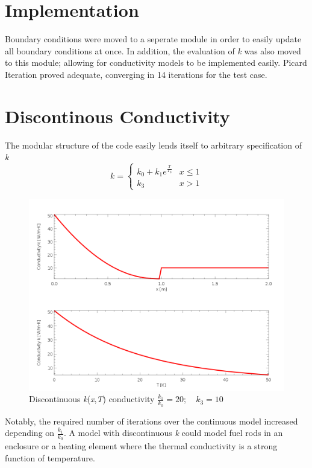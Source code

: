 \documentclass[12pt,twocolumn]{article}
\begin{document}
\section*{Implementation}
Boundary conditions were moved to a seperate module in order to easily update all boundary conditions at once. In addition, the evaluation of \emph{k}
was also moved to this module; allowing for conductivity models to be implemented easily. Picard Iteration proved adequate, converging
in 14 iterations for the test case.
\section*{Discontinous Conductivity}
The modular structure of the code easily lends itself to arbitrary specification of \emph{k}
\[k = 
\begin{cases}
k_0 + k_1 e^{\frac{T}{T_0}} & x \leq 1 \\
k_3 & x > 1
\end{cases}\]
\begin{figure}
\includegraphics[width=\columnwidth]{conductivity.png}
\footnotesize{\caption{Discontinuous \emph{k}(\emph{x},\emph{T}) conductivity $\frac{k_1}{k_0}=20;\hspace{1em} k_3=10$}}
\end{figure}
Notably, the required number of iterations over the continuous model increased depending on $\frac{k_1}{k_0}$. A model with discontinuous
\emph{k} could model fuel rods in an enclosure or a heating element where the thermal conductivity is a strong function of temperature.
\end{document}
